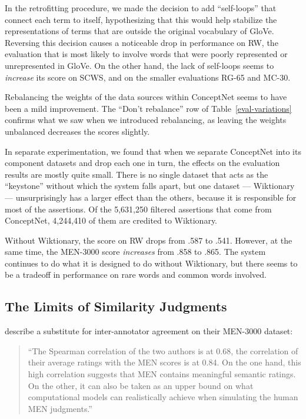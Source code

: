 \documentclass[11pt,letterpaper]{article}
\begin{document}
In the retrofitting procedure, we made the decision to add ``self-loops'' that
connect each term to itself, hypothesizing that this would help stabilize the
representations of terms that are outside the original vocabulary of GloVe.
Reversing this decision causes a noticeable drop in performance on RW, the
evaluation that is most likely to involve words that were poorly represented or
unrepresented in GloVe. On the other hand, the lack of self-loops seems to {\em
increase} its score on SCWS, and on the smaller evaluations RG-65 and MC-30.

Rebalancing the weights of the data sources within ConceptNet seems to have
been a mild improvement. The ``Don't rebalance'' row of Table~\ref{eval-variations}
confirms what we saw when we introduced rebalancing,
as leaving the weights unbalanced decreases the scores slightly.

In separate experimentation, we found that when we separate ConceptNet into its
component datasets and drop each one in turn, the effects on the evaluation
results are mostly quite small. There is no single dataset that acts as the
``keystone'' without which the system falls apart, but one dataset ---
Wiktionary --- unsurprisingly has a larger effect than the others, because it
is responsible for most of the assertions. Of the 5,631,250 filtered assertions
that come from ConceptNet, 4,244,410 of them are credited to Wiktionary.

Without Wiktionary, the score on RW drops from .587 to .541. However, at the
same time, the MEN-3000 score {\em increases} from .858 to .865. The system
continues to do what it is designed to do without Wiktionary, but there seems to
be a tradeoff in performance on rare words and common words involved.

\subsection{The Limits of Similarity Judgments}

 describe a substitute for inter-annotator agreement on
their MEN-3000 dataset:

\begin{quote}
``The Spearman correlation of the two authors is at 0.68, the correlation of their
average ratings with the MEN scores is at 0.84. On the one hand, this high
correlation suggests that MEN contains meaningful semantic ratings. On the
other, it can also be taken as an upper bound on what computational models can
realistically achieve when simulating the human MEN judgments.''
\end{quote}
\end{document}
